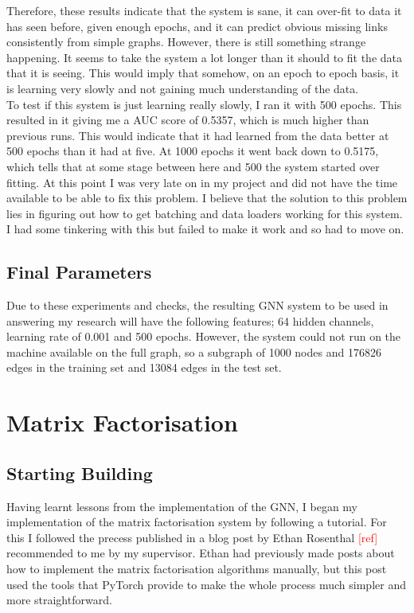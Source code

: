 \documentclass{l4proj}
\begin{document}
Therefore, these results indicate that the system is sane, it can over-fit to data it has seen before, given enough epochs, and it can predict obvious missing links consistently from simple graphs. However, there is still something strange happening. It seems to take the system a lot longer than it should to fit the data that it is seeing. This would imply that somehow, on an epoch to epoch basis, it is learning very slowly and not gaining much understanding of the data. \\

To test if this system is just learning really slowly, I ran it with 500 epochs. This resulted in it giving me a AUC score of 0.5357, which is much higher than previous runs. This would indicate that it had learned from the data better at 500 epochs than it had at five. At 1000 epochs it went back down to 0.5175, which tells that at some stage between here and 500 the system started over fitting. At this point I was very late on in my project and did not have the time available to be able to fix this problem. I believe that the solution to this problem lies in figuring out how to get batching and data loaders working for this system. I had some tinkering with this but failed to make it work and so had to move on. \\

\subsection{Final Parameters}

Due to these experiments and checks, the resulting GNN system to be used in answering my research will have the following features; 64 hidden channels, learning rate of 0.001 and 500 epochs. However, the system could not run on the machine available on the full graph, so a subgraph of 1000 nodes and 176826 edges in the training set and 13084 edges in the test set.\\

\section{Matrix Factorisation}

\subsection{Starting Building}

Having learnt lessons from the implementation of the GNN, I began my implementation of the matrix factorisation system by following a tutorial. For this I followed the precess published in a blog post by Ethan Rosenthal \textcolor{red}{[ref]} recommended to me by my supervisor. Ethan had previously made posts about how to implement the matrix factorisation algorithms manually, but this post used the tools that PyTorch provide to make the whole process much simpler and more straightforward. \\
\end{document}
